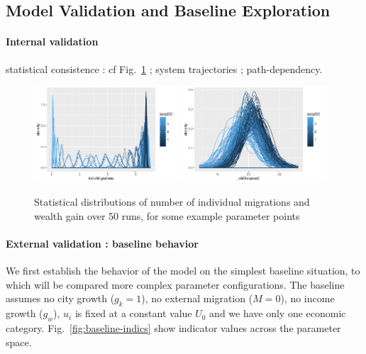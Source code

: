 \subsection{Model Validation and Baseline Exploration}

\paragraph{Internal validation} 

statistical consistence : cf Fig.~\ref{fig:statistical-valid} ; system trajectories ; path-dependency.

\begin{figure}
\centering
\includegraphics[width=0.48\textwidth]{figures/baseline_hist_indivMigrations_colorbetaDC}
\includegraphics[width=0.48\textwidth]{figures/baseline_hist_jobDistance0_colorbetaDC}
\caption{Statistical distributions of number of individual migrations and wealth gain over 50 runs, for some example parameter points}
\label{fig:statistical-valid}
\end{figure}




\paragraph{External validation : baseline behavior}

We first establish the behavior of the model on the simplest baseline situation, to which will be compared more complex parameter configurations. The baseline assumes no city growth ($g_k=1$), no external migration ($M=0$), no income growth ($g_{w}$), $u_i$ is fixed at a constant value $U_0$ and we have only one economic category. Fig.~\ref{fig:baseline-indics} show indicator values across the parameter space.


